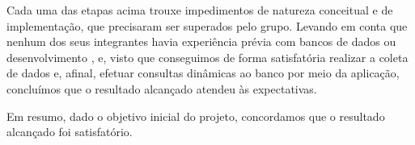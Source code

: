    Cada uma das etapas acima trouxe impedimentos de natureza conceitual e de implementação, que precisaram ser superados pelo
   grupo. Levando em conta que nenhum dos seus
   integrantes havia experiência prévia com bancos de dados ou desenvolvimento , e, visto que conseguimos
   de forma satisfatória realizar a coleta de dados e, afinal, efetuar consultas dinâmicas ao banco por meio da aplicação,
   concluímos que o resultado alcançado atendeu às expectativas.

   Em resumo, dado o objetivo inicial do projeto, concordamos que o resultado alcançado foi satisfatório.
   
